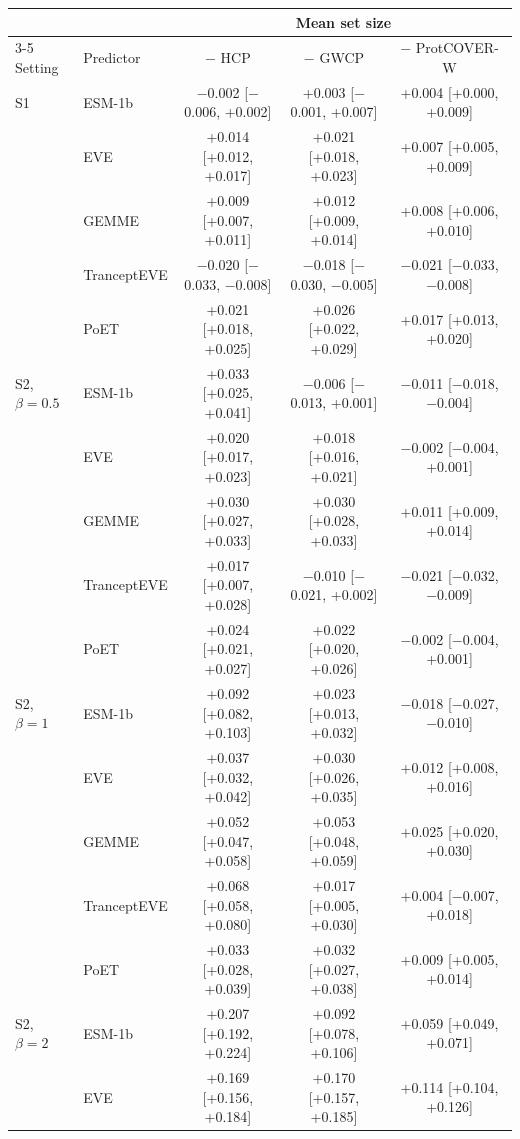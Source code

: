 \begin{tabular}{llccc}
\toprule
 & & \multicolumn{3}{c}{Mean set size} \\
\cmidrule(lr){3-5}
Setting & Predictor & $-$ HCP & $-$ GWCP & $-$ ProtCOVER-W \\
\midrule
S1 & ESM-1b & $-$0.002 [$-$0.006, +0.002] & +0.003 [$-$0.001, +0.007] & +0.004 [+0.000, +0.009] \\
 & EVE & +0.014 [+0.012, +0.017] & +0.021 [+0.018, +0.023] & +0.007 [+0.005, +0.009] \\
 & GEMME & +0.009 [+0.007, +0.011] & +0.012 [+0.009, +0.014] & +0.008 [+0.006, +0.010] \\
 & TranceptEVE & $-$0.020 [$-$0.033, $-$0.008] & $-$0.018 [$-$0.030, $-$0.005] & $-$0.021 [$-$0.033, $-$0.008] \\
 & PoET & +0.021 [+0.018, +0.025] & +0.026 [+0.022, +0.029] & +0.017 [+0.013, +0.020] \\
\midrule
S2, $\beta=0.5$ & ESM-1b & +0.033 [+0.025, +0.041] & $-$0.006 [$-$0.013, +0.001] & $-$0.011 [$-$0.018, $-$0.004] \\
 & EVE & +0.020 [+0.017, +0.023] & +0.018 [+0.016, +0.021] & $-$0.002 [$-$0.004, +0.001] \\
 & GEMME & +0.030 [+0.027, +0.033] & +0.030 [+0.028, +0.033] & +0.011 [+0.009, +0.014] \\
 & TranceptEVE & +0.017 [+0.007, +0.028] & $-$0.010 [$-$0.021, +0.002] & $-$0.021 [$-$0.032, $-$0.009] \\
 & PoET & +0.024 [+0.021, +0.027] & +0.022 [+0.020, +0.026] & $-$0.002 [$-$0.004, +0.001] \\
\midrule
S2, $\beta=1$ & ESM-1b & +0.092 [+0.082, +0.103] & +0.023 [+0.013, +0.032] & $-$0.018 [$-$0.027, $-$0.010] \\
 & EVE & +0.037 [+0.032, +0.042] & +0.030 [+0.026, +0.035] & +0.012 [+0.008, +0.016] \\
 & GEMME & +0.052 [+0.047, +0.058] & +0.053 [+0.048, +0.059] & +0.025 [+0.020, +0.030] \\
 & TranceptEVE & +0.068 [+0.058, +0.080] & +0.017 [+0.005, +0.030] & +0.004 [$-$0.007, +0.018] \\
 & PoET & +0.033 [+0.028, +0.039] & +0.032 [+0.027, +0.038] & +0.009 [+0.005, +0.014] \\
\midrule
S2, $\beta=2$ & ESM-1b & +0.207 [+0.192, +0.224] & +0.092 [+0.078, +0.106] & +0.059 [+0.049, +0.071] \\
 & EVE & +0.169 [+0.156, +0.184] & +0.170 [+0.157, +0.185] & +0.114 [+0.104, +0.126] \\

\end{tabular}
